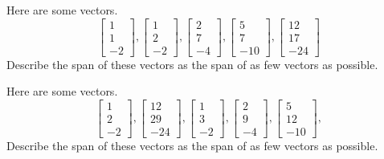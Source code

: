 \documentclass{ximera}
\begin{document}
\begin{problem}\label{prb:3.5} Here are some vectors.
\begin{equation*}
\left[
\begin{array}{r}
1 \\
1 \\
-2
\end{array}
\right] ,\left[
\begin{array}{r}
1 \\
2 \\
-2
\end{array}
\right] ,\left[
\begin{array}{r}
2 \\
7 \\
-4
\end{array}
\right] ,\left[
\begin{array}{r}
5 \\
7 \\
-10
\end{array}
\right] ,\left[
\begin{array}{r}
12 \\
17 \\
-24
\end{array}
\right]
\end{equation*}
Describe the span of these vectors as the span of as few vectors as possible.
\end{problem}

\begin{problem}\label{prb:3.6} Here are some vectors.
\begin{equation*}
\left[
\begin{array}{r}
1 \\
2 \\
-2
\end{array}
\right] ,\left[
\begin{array}{r}
12 \\
29 \\
-24
\end{array}
\right] ,\left[
\begin{array}{r}
1 \\
3 \\
-2
\end{array}
\right] ,\left[
\begin{array}{r}
2 \\
9 \\
-4
\end{array}
\right] ,\left[
\begin{array}{r}
5 \\
12 \\
-10
\end{array}
\right] ,
\end{equation*}
Describe the span of these vectors as the span of as few vectors as possible.
\end{problem}
\end{document}
